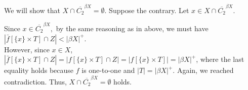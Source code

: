 \documentclass{article}
\begin{document}
\vskip 10pt

We will show that $X\cap \overline{C_2}^{\beta X}=\emptyset$. Suppose the contrary. Let $x\in X \cap \overline{C_2}^{\beta X}$. 


Since $x\in \overline{C_2}^{\beta X},$ by the same reasoning as in above, we must have  $\left|\bar{f}\left[\{x\} \times T \right] \cap Z \right| < \left|\beta X \right|^+$. \\

However, since $x\in X$, $\left|\bar{f}\left[\{x\} \times T \right] \cap Z \right| =\left| f\left[\{x\} \times T \right]\cap Z \right| = \left| f\left[\{x\} \times T\right]\right|= \left|\beta X \right|^+$, where the last equality holds because $f$ is one-to-one and $|T|=|\beta X|^+$. 
Again, we reached contradiction. Thus, $X\cap \overline{C_2}^{\beta X}=\emptyset$ holds. 
\end{document}
